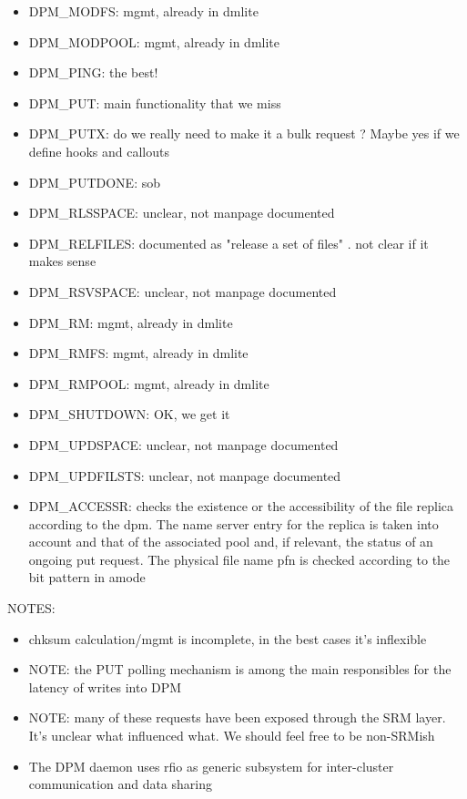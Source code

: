 \documentclass[a4paper,10pt]{scrreprt}
\begin{document}
\begin{itemize}
\item DPM\_MODFS: mgmt, already in dmlite

\item DPM\_MODPOOL: mgmt, already in dmlite

\item DPM\_PING: the best!

\item DPM\_PUT: main functionality that we miss
\item DPM\_PUTX: do we really need to make it a bulk request ? Maybe yes if we define hooks and callouts

\item DPM\_PUTDONE: sob

\item DPM\_RLSSPACE: unclear, not manpage documented

\item DPM\_RELFILES: documented as "release a set of files" . not clear if it makes sense

\item DPM\_RSVSPACE: unclear, not manpage documented

\item DPM\_RM: mgmt, already in dmlite

\item DPM\_RMFS: mgmt, already in dmlite

\item DPM\_RMPOOL: mgmt, already in dmlite

\item DPM\_SHUTDOWN: OK, we get it

\item DPM\_UPDSPACE: unclear, not manpage documented

\item DPM\_UPDFILSTS: unclear, not manpage documented

\item DPM\_ACCESSR: checks the existence  or  the  accessibility  of  the  file
       replica  according to the dpm. The name server entry for the replica is
       taken into account and that of the associated pool  and,  if  relevant,
       the  status  of  an ongoing put request.  The physical file name pfn is
       checked according to the bit pattern in amode
       
\end{itemize}

NOTES:
\begin{itemize}
 \item chksum calculation/mgmt is incomplete, in the best cases it's inflexible
 \item NOTE: the PUT polling mechanism is among the main responsibles for the latency of writes into DPM
 \item NOTE: many of these requests have been exposed through the SRM layer. It's unclear what influenced what. We should feel free to be non-SRMish
 \item The DPM daemon uses rfio as generic subsystem for inter-cluster communication and data sharing
\end{itemize}
\end{document}
